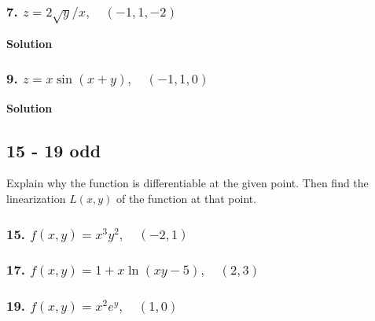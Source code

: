 \documentclass{article}
\newcommand{\solution}{\centerline{\textbf{Solution}}}
\begin{document}
\subsubsection*{7. $z = 2\sqrt y / x,\quad (-1,1,-2)$}
\solution 
\subsubsection*{9. $z = x\sin (x+y),\quad (-1, 1, 0)$}
\solution
\subsection*{15 - 19 odd}
Explain why the function is differentiable at the given point. Then find the linearization $L(x,y)$ of the function at that point.
\subsubsection*{15. $f(x,y) = x^3y^2,\quad (-2,1)$}
\subsubsection*{17. $f(x,y) = 1 + x\ln (xy-5),\quad (2,3)$}
\subsubsection*{19. $f(x,y) = x^2e^y,\quad (1,0)$}
\end{document}
